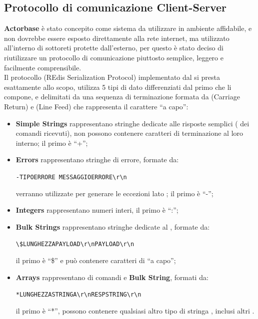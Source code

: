 \documentclass{scalatekids-article}
\begin{document}
\subsection{Protocollo di comunicazione Client-Server}
\label{sec:RESP}

\textbf{Actorbase} è stato concepito come sistema da utilizzare in ambiente
affidabile, e non dovrebbe essere esposto direttamente alla rete internet, ma
utilizzato all'interno di sottoreti protette dall'esterno, per questo è stato
deciso di riutilizzare un protocollo di comunicazione
piuttosto semplice, leggero e facilmente comprensibile.\\
Il protocollo  (REdis Serialization Protocol) implementato
dal   si presta esattamente allo scopo, utilizza
5 tipi di dato differenziati dal primo  che li compone, e delimitati
da una sequenza di terminazione formata da  (Carriage Return) e 
(Line Feed) che rappresenta il carattere ``a capo'':
\begin{itemize}
\item \textbf{Simple Strings} rappresentano stringhe dedicate alle risposte
  semplici ( dei comandi ricevuti), non possono contenere caratteri
  di terminazione al loro interno; il primo  è ``+'';
\item \textbf{Errors} rappresentano stringhe di errore, formate da:
  \begin{center}
    \verb=-TIPOERRORE MESSAGGIOERRORE\r\n=
  \end{center}
  verranno utilizzate per generare le eccezioni lato ; il primo  è ``-'';
\item \textbf{Integers} rappresentano numeri interi, il primo  è ``:'';
\item \textbf{Bulk Strings} rappresentano stringhe dedicate al , formate da:
  \begin{center}
    \verb=\$LUNGHEZZAPAYLOAD\r\nPAYLOAD\r\n=
  \end{center}
  il primo  è ``\$'' e può contenere caratteri di ``a capo'';
\item \textbf{Arrays} rappresentano  di comandi e \textbf{Bulk String}, formati da:
  \begin{center}
    \verb=*LUNGHEZZASTRINGA\r\nRESPSTRING\r\n=
  \end{center}
  il primo  è ``*'', possono contenere qualsiasi altro tipo di stringa , inclusi altri .
\end{itemize}
\end{document}
